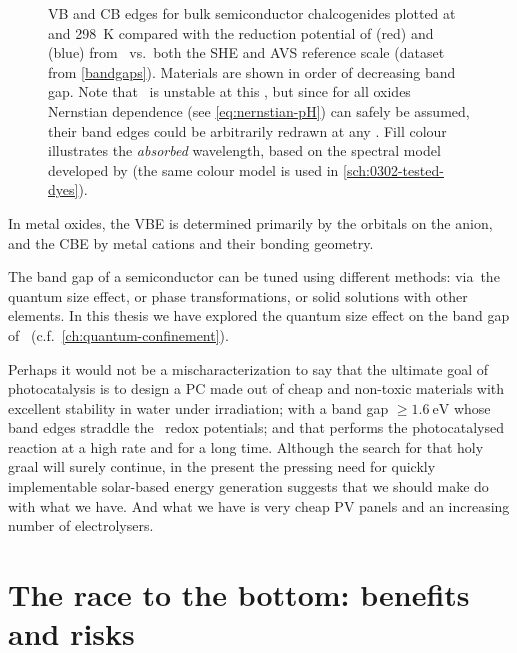 \documentclass[webedition,openright,titles,swedish,english]{LuaUUThesis}\usepackage[]{graphicx}\usepackage[]{xcolor}
\newcommand{\cf}{c.f.}
\newcommand{\via}{via}
\newcommand{\vs}{vs.}
\begin{document}
\begin{figure}[tbp]
\begin{tikzpicture}[font=\scriptsize\fnstyle, xscale=1.00, yscale=1.00]
\end{tikzpicture}
\caption[Band edges of semiconductor chalcogenides]{%
   \protect\Gls{VB} and \protect\gls{CB} edges for bulk semiconductor chalcogenides
   plotted at  and \qty{298}{\kelvin} compared with the reduction potential
   of \protect{} (red) and
   \protect{} (blue) from \water\ \vs\ both the
   \protect\gls{SHE} and \protect\gls{AVS} reference scale (dataset from \cref{bandgaps}).
   Materials are shown in order of decreasing band gap.
   Note that \ZnO\ is unstable at this \pH, but since for all oxides
   Nernstian dependence (see \cref{eq:nernstian-pH})
   can safely be assumed, their band edges could be arbitrarily redrawn at any \pH.
   Fill colour illustrates the \emph{absorbed} wavelength, based on
   the spectral model developed by \textcite{Aphalo2015}
   (the same colour model is used in \cref{sch:0302-tested-dyes}).}
\label{fig:0100-bandgaps-all}
\end{figure}

\egroup



In metal oxides, the \gls{VBE} is determined primarily by the orbitals on the
\oxide{} anion, and the \gls{CBE} by metal cations and their bonding geometry.

The band gap of a semiconductor can be tuned using different methods:
\via\ the quantum size effect, or phase transformations, or solid solutions
with other elements.
In this thesis we have explored the quantum size effect on the band gap of \ZnO\
(\cf\ \cref{ch:quantum-confinement}).

Perhaps it would not be a mischaracterization to say that
the ultimate goal of photocatalysis is to design a \gls{PC} made out of
cheap and non-toxic materials with excellent stability in water under irradiation;
with a band gap $\geq\qty{1.6}{\eV}$ whose band edges straddle the \water\ redox
potentials;
and that performs the photocatalysed reaction at a high rate and for a long time.
Although the search for that holy graal will surely continue,
in the present the pressing need for quickly implementable solar-based
energy generation suggests that we should make do with what we have.
And what we have is very cheap \gls{PV} panels and an increasing
number of electrolysers.






\section{The race to the bottom: benefits and risks}
\label{intro:nanoparticles-history-risks}
\end{document}

